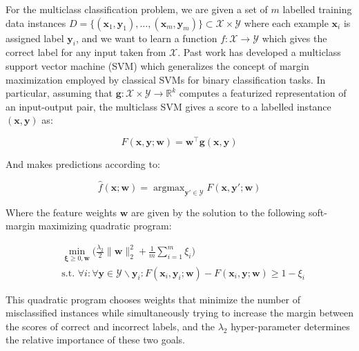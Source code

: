 \documentclass{article} %
\DeclareMathOperator*{\argmax}{argmax}
\begin{document}
For the multiclass classification problem, we are given a set of
$m$ labelled training data instances
$D=\{(\mathbf{x}_1,\mathbf{y}_1),\hdots,(\mathbf{x}_m, \mathbf{y}_m)\}\subset\mathcal{X}\times\mathcal{Y}$ 
where each example $\mathbf{x}_i$ is assigned label 
$\mathbf{y}_i$, and we want to learn a function 
$f:\mathcal{X}\rightarrow\mathcal{Y}$ which gives the correct
label for any input taken from $\mathcal{X}$.  Past work has developed
a multiclass support vector machine (SVM) which generalizes the 
concept of margin maximization employed by classical SVMs for binary
classification tasks. In particular, assuming that
$\mathbf{g}:\mathcal{X}\times\mathcal{Y}\rightarrow \mathbb{R}^k$ 
computes a featurized representation of an input-output pair, the 
multiclass SVM gives a score to a labelled instance $(\mathbf{x},\mathbf{y})$ 
as:

\begin{equation}
\label{score}
F(\mathbf{x},\mathbf{y};\mathbf{w})= \mathbf{w}^\top \mathbf{g}(\mathbf{x},\mathbf{y})
\end{equation}

And makes predictions according to:

\begin{equation}
\label{prediction}
\hat{f}(\mathbf{x};\mathbf{w})=\argmax_{\mathbf{y}'\in\mathcal{Y}} F(\mathbf{x},\mathbf{y}';\mathbf{w})
\end{equation}

Where the feature weights $\mathbf{w}$ are given by the
solution to the following soft-margin maximizing quadratic program:

\begin{equation}
\begin{split}
& \min_{\mathbf{\xi}\geq 0, \mathbf{w}}\big(\frac{\lambda_2}{2}\|\mathbf{w}\|_2^2+\frac{1}{m}\sum_{i=1}^m\xi_i\big) \\
& \text{s.t.     } \forall i : \forall \mathbf{y}\in\mathcal{Y}\backslash\mathbf{y}_i : F(\mathbf{x}_i,\mathbf{y}_i;\mathbf{w})-F(\mathbf{x}_i,\mathbf{y};\mathbf{w})\geq 1-\xi_i
\end{split}
\end{equation}

This quadratic program chooses weights that minimize
the number of misclassified instances while simultaneously
trying to increase the margin between the scores of 
correct and incorrect labels, and the $\lambda_2$
hyper-parameter determines the relative importance of
these two goals. 
\end{document}
